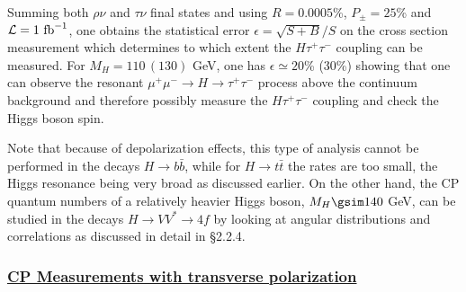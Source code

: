 Summing both $\rho\nu$ and $\tau \nu$ final states and using $R=0.0005$\%, 
$P_\pm=25$\% and ${\cal L}=1~{\rm fb}^{-1}$, one obtains the statistical
error $\epsilon\!=\!\sqrt{S+B}/S$ on the cross section measurement which
determines to which extent the $H \tau^+ \tau^-$ coupling can be measured. For
$M_H\!=\!110\, (130)$ GeV, one has $\epsilon \simeq 20$\% (30\%) showing that 
one can observe the resonant $\mu^+ \mu^- \to H \to \tau^+ \tau^-$ process 
above the continuum background and therefore possibly  measure the $H \tau^+ 
\tau^-$ coupling and check the Higgs boson spin. \s

Note that because of depolarization effects, this type  of analysis cannot be
performed in the decays $H\to b\bar b$, while for $H \to t\bar t$ the rates are
too small, the Higgs resonance being very broad as discussed earlier. On the
other hand, the CP quantum numbers of a relatively heavier Higgs boson, $M_H
\gsim 140$ GeV, can be studied in the decays $H\to VV^* \to 4f$ by looking at
angular distributions and correlations as discussed  in detail in \S2.2.4.  
 
\subsubsection*{\underline{CP Measurements with transverse polarization}}

